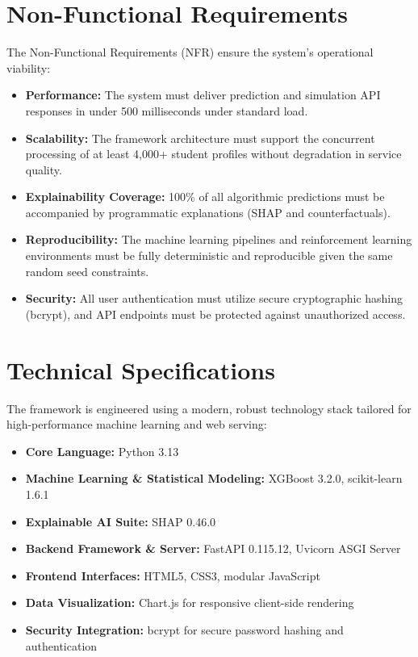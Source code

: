 \documentclass[12pt,a4paper]{report}
\begin{document}
\section{Non-Functional Requirements}
The Non-Functional Requirements (NFR) ensure the system's operational viability:
\begin{itemize}
    \item \textbf{Performance:} The system must deliver prediction and simulation API responses in under 500 milliseconds under standard load.
    \item \textbf{Scalability:} The framework architecture must support the concurrent processing of at least 4,000+ student profiles without degradation in service quality.
    \item \textbf{Explainability Coverage:} 100\% of all algorithmic predictions must be accompanied by programmatic explanations (SHAP and counterfactuals).
    \item \textbf{Reproducibility:} The machine learning pipelines and reinforcement learning environments must be fully deterministic and reproducible given the same random seed constraints.
    \item \textbf{Security:} All user authentication must utilize secure cryptographic hashing (bcrypt), and API endpoints must be protected against unauthorized access.
\end{itemize}

\section{Technical Specifications}
The framework is engineered using a modern, robust technology stack tailored for high-performance machine learning and web serving:
\begin{itemize}
    \item \textbf{Core Language:} Python 3.13
    \item \textbf{Machine Learning \& Statistical Modeling:} XGBoost 3.2.0, scikit-learn 1.6.1
    \item \textbf{Explainable AI Suite:} SHAP 0.46.0
    \item \textbf{Backend Framework \& Server:} FastAPI 0.115.12, Uvicorn ASGI Server
    \item \textbf{Frontend Interfaces:} HTML5, CSS3, modular JavaScript
    \item \textbf{Data Visualization:} Chart.js for responsive client-side rendering
    \item \textbf{Security Integration:} bcrypt for secure password hashing and authentication
\end{itemize}
\end{document}
